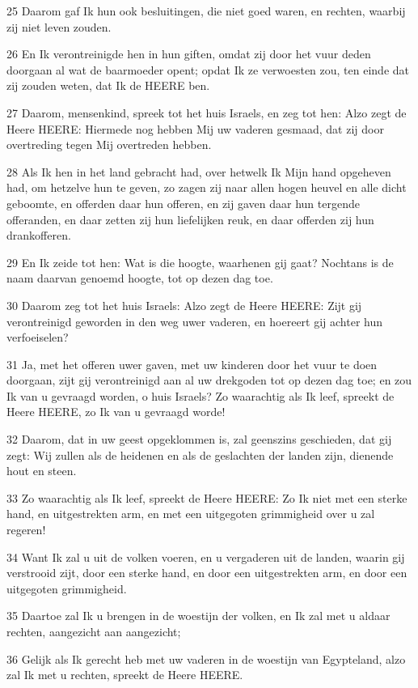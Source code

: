 \par 25 Daarom gaf Ik hun ook besluitingen, die niet goed waren, en rechten, waarbij zij niet leven zouden.
\par 26 En Ik verontreinigde hen in hun giften, omdat zij door het vuur deden doorgaan al wat de baarmoeder opent; opdat Ik ze verwoesten zou, ten einde dat zij zouden weten, dat Ik de HEERE ben.
\par 27 Daarom, mensenkind, spreek tot het huis Israels, en zeg tot hen: Alzo zegt de Heere HEERE: Hiermede nog hebben Mij uw vaderen gesmaad, dat zij door overtreding tegen Mij overtreden hebben.
\par 28 Als Ik hen in het land gebracht had, over hetwelk Ik Mijn hand opgeheven had, om hetzelve hun te geven, zo zagen zij naar allen hogen heuvel en alle dicht geboomte, en offerden daar hun offeren, en zij gaven daar hun tergende offeranden, en daar zetten zij hun liefelijken reuk, en daar offerden zij hun drankofferen.
\par 29 En Ik zeide tot hen: Wat is die hoogte, waarhenen gij gaat? Nochtans is de naam daarvan genoemd hoogte, tot op dezen dag toe.
\par 30 Daarom zeg tot het huis Israels: Alzo zegt de Heere HEERE: Zijt gij verontreinigd geworden in den weg uwer vaderen, en hoereert gij achter hun verfoeiselen?
\par 31 Ja, met het offeren uwer gaven, met uw kinderen door het vuur te doen doorgaan, zijt gij verontreinigd aan al uw drekgoden tot op dezen dag toe; en zou Ik van u gevraagd worden, o huis Israels? Zo waarachtig als Ik leef, spreekt de Heere HEERE, zo Ik van u gevraagd worde!
\par 32 Daarom, dat in uw geest opgeklommen is, zal geenszins geschieden, dat gij zegt: Wij zullen als de heidenen en als de geslachten der landen zijn, dienende hout en steen.
\par 33 Zo waarachtig als Ik leef, spreekt de Heere HEERE: Zo Ik niet met een sterke hand, en uitgestrekten arm, en met een uitgegoten grimmigheid over u zal regeren!
\par 34 Want Ik zal u uit de volken voeren, en u vergaderen uit de landen, waarin gij verstrooid zijt, door een sterke hand, en door een uitgestrekten arm, en door een uitgegoten grimmigheid.
\par 35 Daartoe zal Ik u brengen in de woestijn der volken, en Ik zal met u aldaar rechten, aangezicht aan aangezicht;
\par 36 Gelijk als Ik gerecht heb met uw vaderen in de woestijn van Egypteland, alzo zal Ik met u rechten, spreekt de Heere HEERE.
